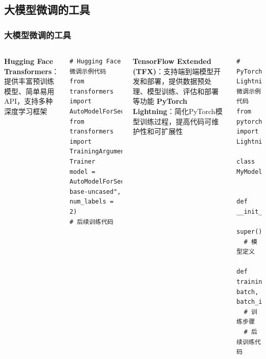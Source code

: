 \subsection{大模型微调的工具}
\begin{frame}
    \frametitle{大模型微调的工具}
    \begin{columns}[c]
            \textbf{Hugging Face Transformers}：提供丰富预训练模型、简单易用API，支持多种深度学习框架
            \begin{lstlisting}[style=pythonstyle]
# Hugging Face微调示例代码
from transformers import AutoModelForSequenceClassification
from transformers import TrainingArguments, Trainer
model = AutoModelForSequenceClassification.from_pretrained("bert-base-uncased", num_labels = 2)
# 后续训练代码
            \end{lstlisting}
            \textbf{TensorFlow Extended (TFX)}：支持端到端模型开发和部署，提供数据预处理、模型训练、评估和部署等功能
            \textbf{PyTorch Lightning}：简化PyTorch模型训练过程，提高代码可维护性和可扩展性
            \begin{lstlisting}[style=pythonstyle]
# PyTorch Lightning微调示例代码
from pytorch_lightning import LightningModule

class MyModel(LightningModule):

     def __init__(self):
         super().__init__()
  # 模型定义
    def training_step(self, batch, batch_idx):
  # 训练步骤
  # 后续训练代码
            \end{lstlisting}
    \end{columns}
\end{frame}

